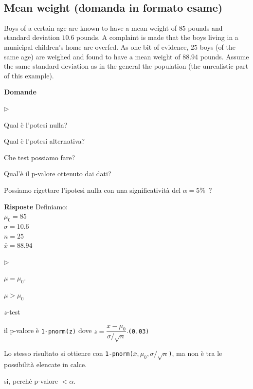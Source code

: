 \documentclass[12pt,openany]{book}
\newcommand{\mylabel}[1]{{\footnotesize\textsf{#1}}\hfill}
\renewenvironment{itemize}
  {\begin{list}{$\triangleright$}{%
   \setlength{\parskip}{0mm}
   \setlength{\topsep}{.2\baselineskip}
   \setlength{\rightmargin}{0mm}
   \setlength{\listparindent}{0mm}
   \setlength{\itemindent}{0mm}
   \setlength{\labelwidth}{3ex}
   \setlength{\itemsep}{.4\baselineskip}
   \setlength{\parsep}{0mm}
   \setlength{\partopsep}{0mm}
   \setlength{\labelsep}{1ex}
   \setlength{\leftmargin}{\labelwidth+\labelsep}
   \let\makelabel\mylabel}}{%
   \end{list}\vspace*{-1.3mm}}
\theoremstyle{mio}
\theoremstyle{liscio}
\begin{document}
\hfill{}\clearpage\
\subsection{Mean weight (domanda in formato esame)}

Boys of a certain age are known to have a mean weight of $85$ pounds and standard deviation $10.6$ pounds. A complaint is made that the boys living in a municipal children's home are overfed. As one bit of evidence, $25$ boys (of the same age) are weighed and found to have a mean weight of $88.94$ pounds. Assume the same standard deviation as in the general the population (the unrealistic part of this example).


\textbf{Domande}

\begin{itemize}
\item[1.] Qual è l'potesi nulla?

\item[2.] Qual è l'potesi alternativa?

\item[3.] Che test possiamo fare?

\item[4.] Qual'è il p-valore ottenuto dai dati?

\item[5.] Possiamo rigettare l'ipotesi nulla con una significatività del $\alpha=5\%$~?
\end{itemize}

\textbf{Risposte} Definiamo:\\
$\mu_0=85$\\
$\sigma=10.6$\\
$n=25$\\
$\bar x=88.94$
\begin{itemize}
\item[1.] $\mu=\mu_0$.
\item[2.] $\mu>\mu_0$ 
\item[3.] $z$-test
\item[4.] il p-valore è {\tt 1-pnorm(z)} dove $z=\dfrac{\bar x-\mu_0}{\sigma/\sqrt{n}}$.\hfill {\tt (0.03)}

Lo stesso risultato si ottienre con {\tt 1-pnorm($\bar x,\mu_0,\sigma/\sqrt{n}$)}, ma non è tra le possibilità elencate in calce.
\item[5.] si, perché  p-valore $<\alpha$.
\end{itemize}
\end{document}
